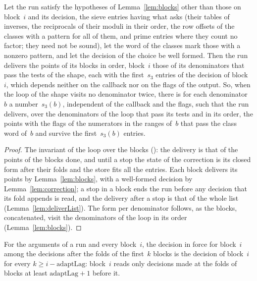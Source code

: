 \begin{theorem}\label{thm:blocks}
  \leanok
  Let the run satisfy the hypotheses of Lemma~\ref{lem:blocks} other than those on block~$i$ and its
  decision, the sieve entries having what  asks (their tables of
  inverses, the reciprocals of their moduli in their order, the row offsets of the classes with a
  pattern for all of them, and prime entries where they count no factor; they need not be sound),
  let the word of the classes mark those with a nonzero pattern, and let the decision of the choice
  be well formed. Then the run delivers the points of its blocks in order, block~$i$ those of its
  denominators that pass the tests of the shape, each with the first~$s_3$ entries of the decision
  of block~$i$, which depends neither on the callback nor on the flags of the output. So, when the
  loop of the shape visits no denominator twice, there is for each denominator~$b$ a
  number~$s_3(b)$, independent of the callback and the flags, such that the run delivers, over the
  denominators of the loop that pass its tests and in its order, the points with the flags of the
  numerators in the ranges of~$b$ that pass the class word of~$b$ and survive the first~$s_3(b)$
  entries.
\end{theorem}

\begin{proof}
  \leanok
  The invariant of the loop over the blocks (): the
  delivery is that of the points of the blocks done, and until a stop the state of the correction is
  its closed form after their folds and the store fits all the entries. Each block delivers its
  points by Lemma~\ref{lem:blocks}, with a well-formed decision by Lemma~\ref{lem:correction}; a
  stop in a block ends the run before any decision that its fold appends is read, and the delivery
  after a stop is that of the whole list (Lemma~\ref{lem:deliverList}). The form per denominator
  follows, as the blocks, concatenated, visit the denominators of the loop in its order
  (Lemma~\ref{lem:blocks}).
\end{proof}

\begin{theorem}\label{thm:lag}
  \leanok
  For the arguments of a run and every block~$i$, the decision in force for block~$i$ among the
  decisions after the folds of the first~$k$ blocks is the decision of block~$i$ for every
  $k \ge i - \mathrm{adaptLag}$: block~$i$ reads only decisions made at the folds of blocks at least
  $\mathrm{adaptLag} + 1$ before it.
\end{theorem}

